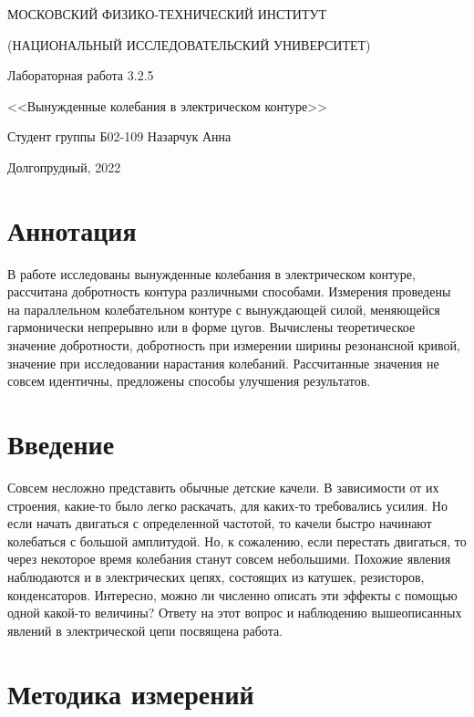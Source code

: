 \documentclass[a4paper,12pt]{article} %
\begin{document}
\begin{titlepage}

\thispagestyle{empty}

\centerline{МОСКОВСКИЙ ФИЗИКО-ТЕХНИЧЕСКИЙ ИНСТИТУТ}
\centerline{(НАЦИОНАЛЬНЫЙ ИССЛЕДОВАТЕЛЬСКИЙ УНИВЕРСИТЕТ)}

\vfill

\centerline{\huge{Лабораторная работа 3.2.5}}
\centerline{\LARGE{<<Вынужденные колебания в электрическом контуре>>}}

\vfill

Студент группы Б02-109 \hfill Назарчук Анна

\vfill

\centerline{Долгопрудный, 2022}
\clearpage
\end{titlepage} 

\section{Аннотация}
В работе исследованы вынужденные колебания в электрическом контуре, рассчитана добротность контура различными способами. Измерения проведены на параллельном колебательном контуре с вынуждающей силой, меняющейся гармонически непрерывно или в форме цугов. Вычислены теоретическое значение добротности, добротность при измерении ширины резонансной кривой, значение при исследовании нарастания колебаний. Рассчитанные значения не совсем идентичны, предложены способы улучшения результатов.

\section{Введение}
Совсем несложно представить обычные детские качели. В зависимости от их строения, какие-то было легко раскачать, для каких-то требовались усилия. Но если начать двигаться с определенной частотой, то качели быстро начинают колебаться с большой амплитудой. Но, к сожалению, если перестать двигаться, то через некоторое время колебания станут совсем небольшими. Похожие явления наблюдаются и в электрических цепях, состоящих из катушек, резисторов, конденсаторов. Интересно, можно ли численно описать эти эффекты с помощью одной какой-то величины? Ответу на этот вопрос и наблюдению вышеописанных явлений в электрической цепи посвящена работа.

\section{Методика измерений}
\end{document}
